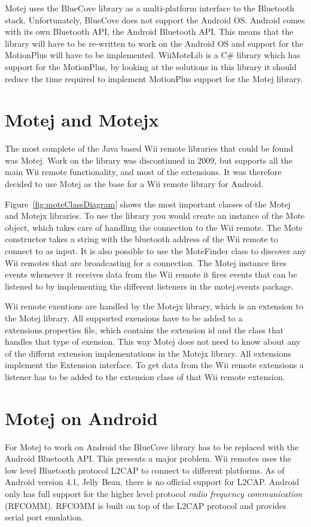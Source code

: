 Motej uses the BlueCove library as a multi-platform interface to the Bluetooth stack. Unfortunately, BlueCove does not support the Android OS. Android comes with its own Bluetooth API, the Android Bluetooth API. This means that the library will have to be re-written to work on the Android OS and support for the MotionPlus will have to be implemented. WiiMoteLib\cite{wiiMoteLib} is a C\# library which has support for the MotionPlus, by looking at the solutions in this library it should reduce the time required to implement MotionPlus support for the Motej library.

\section{Motej and Motejx}
The most complete of the Java based Wii remote libraries that could be found was Motej. Work on the library was discontinued in 2009, but supports all the main Wii remote functionality, and most of the extensions. It was therefore decided to use Motej as the base for a Wii remote library for Android. 

Figure~\ref{fig:moteClassDiagram} shows the most important classes of the Motej and Motejx libraries. To use the library you would create an instance of the Mote object, which takes care of handling the connection to the Wii remote. The Mote constructor takes a string with the bluetooth address of the Wii remote to connect to as input. It is also possible to use the MoteFinder class to discover any Wii remotes that are broadcasting for a connection. The Motej instance fires events whenever it receives data from the Wii remote it fires events that can be listened to by implementing the different listeners in the motej.events package. 

Wii remote exentions are handled by the Motejx library, which is an extension to the Motej library. All supported exensions have to be added to a extensions.properties file, which contains the extension id and the class that handles that type of exension. This way Motej does not need to know about any of the differnt extension implementations in the Motejx library. All extensions implement the Extension interface. To get data from the Wii remote extensions a listener has to be added to the extension class of that Wii remote extension.


\section{Motej on Android}
For Motej to work on Android the BlueCove library has to be replaced with the Android Bluetooth API. This presents a major problem. Wii remotes uses the low level Bluetooth protocol L2CAP to connect to different platforms. As of Android version 4.1, Jelly Bean, \cite{jellyBean} there is no official support for L2CAP. Android only has full support for the higher level protocol \emph{radio frequency communication} (RFCOMM). RFCOMM is built on top of the L2CAP protocol and provides serial port emulation. 

